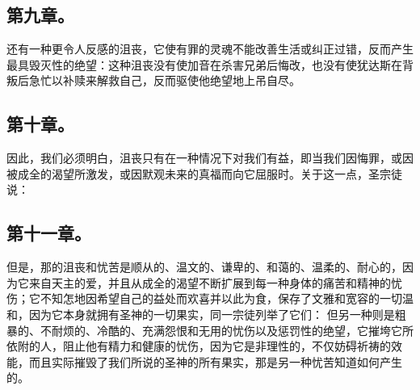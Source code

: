 \subsection{第九章。}

\par

还有一种更令人反感的沮丧，它使有罪的灵魂不能改善生活或纠正过错，反而产生最具毁灭性的绝望：这种沮丧没有使加音在杀害兄弟后悔改，也没有使犹达斯在背叛后急忙以补赎来解救自己，反而驱使他绝望地上吊自尽。\par


\subsection{第十章。}

\par

因此，我们必须明白，沮丧只有在一种情况下对我们有益，即当我们因悔罪，或因被成全的渴望所激发，或因默观未来的真福而向它屈服时。关于这一点，圣宗徒说：\par


\subsection{第十一章。}

\par

但是，那的沮丧和忧苦是顺从的、温文的、谦卑的、和蔼的、温柔的、耐心的，因为它来自天主的爱，并且从成全的渴望不断扩展到每一种身体的痛苦和精神的忧伤；它不知怎地因希望自己的益处而欢喜并以此为食，保存了文雅和宽容的一切温和，因为它本身就拥有圣神的一切果实，同一宗徒列举了它们： 但另一种则是粗暴的、不耐烦的、冷酷的、充满怨恨和无用的忧伤以及惩罚性的绝望，它摧垮它所依附的人，阻止他有精力和健康的忧伤，因为它是非理性的，不仅妨碍祈祷的效能，而且实际摧毁了我们所说的圣神的所有果实，那是另一种忧苦知道如何产生的。\par

